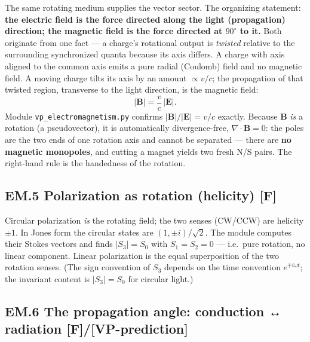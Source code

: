 \documentclass[
  10pt,
]{article}
\begin{document}
The same rotating medium supplies the vector sector. The organizing
statement: \textbf{the electric field is the force directed along the
light (propagation) direction; the magnetic field is the force directed
at \(90^\circ\) to it.} Both originate from one fact --- a charge's
rotational output is \emph{twisted} relative to the surrounding
synchronized quanta because its axis differs. A charge with axis aligned
to the common axis emits a pure radial (Coulomb) field and no magnetic
field. A moving charge tilts its axis by an amount \(\propto v/c\); the
propagation of that twisted region, transverse to the light direction,
is the magnetic field: \[ |\mathbf B| = \frac{v}{c}\,|\mathbf E|. \]
Module \texttt{vp\_electromagnetism.py} confirms
\(|\mathbf B|/|\mathbf E| = v/c\) exactly. Because \(\mathbf B\)
\emph{is} a rotation (a pseudovector), it is automatically
divergence-free, \(\nabla\!\cdot\mathbf B = 0\): the poles are the two
ends of one rotation axis and cannot be separated --- there are
\textbf{no magnetic monopoles}, and cutting a magnet yields two fresh
N/S pairs. The right-hand rule is the handedness of the rotation.

\hypertarget{em.5-polarization-as-rotation-helicity-f}{%
\subsection{\texorpdfstring{EM.5 Polarization as rotation (helicity)
\textbf{{[}F{]}}}{EM.5 Polarization as rotation (helicity) {[}F{]}}}\label{em.5-polarization-as-rotation-helicity-f}}

Circular polarization \emph{is} the rotating field; the two senses
(CW/CCW) are helicity \(\pm 1\). In Jones form the circular states are
\((1,\pm i)/\sqrt 2\). The module computes their Stokes vectors and
finds \(|S_3| = S_0\) with \(S_1 = S_2 = 0\) --- i.e.~pure rotation, no
linear component. Linear polarization is the equal superposition of the
two rotation senses. (The sign convention of \(S_3\) depends on the time
convention \(e^{\mp i\omega t}\); the invariant content is
\(|S_3| = S_0\) for circular light.)

\hypertarget{em.6-the-propagation-angle-conduction-radiation-fvp-prediction}{%
\subsection{\texorpdfstring{EM.6 The propagation angle: conduction ↔
radiation
\textbf{{[}F{]}/{[}VP-prediction{]}}}{EM.6 The propagation angle: conduction ↔ radiation {[}F{]}/{[}VP-prediction{]}}}\label{em.6-the-propagation-angle-conduction-radiation-fvp-prediction}}
\end{document}
